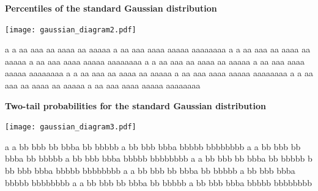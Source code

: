 \documentclass[a4paper]{article}
\begin{document}
\begin{minipage}{7cm}
  \begin{center}
    {\Large\bf Percentiles of the standard Gaussian distribution}
    
    \texttt{[image: gaussian\_diagram2.pdf]}
  \end{center}


  
a a aa aaa aa aaaa aa aaaaa a aa aaa aaaa aaaaa aaaaaaaa 
a a aa aaa aa aaaa aa aaaaa a aa aaa aaaa aaaaa aaaaaaaa 
a a aa aaa aa aaaa aa aaaaa a aa aaa aaaa aaaaa aaaaaaaa 
a a aa aaa aa aaaa aa aaaaa a aa aaa aaaa aaaaa aaaaaaaa 
a a aa aaa aa aaaa aa aaaaa a aa aaa aaaa aaaaa aaaaaaaa 
\end{minipage}\hfill
\begin{minipage}{7cm}
  \begin{center}
    {\Large\bf Two-tail probabilities for the standard Gaussian distribution}

    \texttt{[image: gaussian\_diagram3.pdf]}
  \end{center}
a a bb bbb bb bbba bb bbbbb a bb bbb bbba bbbbb bbbbbbbb 
a a bb bbb bb bbba bb bbbbb a bb bbb bbba bbbbb bbbbbbbb 
a a bb bbb bb bbba bb bbbbb b bb bbb bbba bbbbb bbbbbbbb 
a a bb bbb bb bbba bb bbbbb a bb bbb bbba bbbbb bbbbbbbb 
a a bb bbb bb bbba bb bbbbb a bb bbb bbba bbbbb bbbbbbbb 
\end{minipage}



\end{document}
